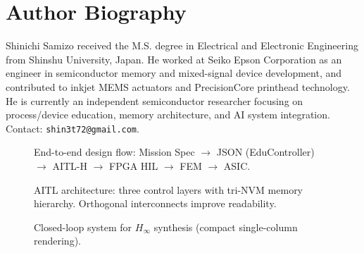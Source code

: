 \documentclass[conference]{IEEEtran}
\begin{document}
\section*{Author Biography}
\begingroup\small
Shinichi Samizo received the M.S. degree in Electrical and Electronic Engineering from Shinshu University, Japan. He worked at Seiko Epson Corporation as an engineer in semiconductor memory and mixed-signal device development, and contributed to inkjet MEMS actuators and PrecisionCore printhead technology. He is currently an independent semiconductor researcher focusing on process/device education, memory architecture, and AI system integration. Contact: \texttt{shin3t72@gmail.com}.
\endgroup

\FloatBarrier %

\begin{figure*}[!b]
  \centering
  \resizebox{0.60\textwidth}{!}{%
  }
  \vspace{-2mm}
  \caption{End-to-end design flow: Mission Spec $\rightarrow$ JSON (EduController) $\rightarrow$ AITL-H $\rightarrow$ FPGA HIL $\rightarrow$ FEM $\rightarrow$ ASIC.}
  \label{fig:flow}
\end{figure*}

\begin{figure*}[!b]
  \centering
  \resizebox{0.90\textwidth}{!}{%
  }
  \vspace{-1mm}
  \caption{AITL architecture: three control layers with tri-NVM memory hierarchy. Orthogonal interconnects improve readability.}
  \label{fig:arch}
\end{figure*}

\begin{figure*}[!b]
  \centering
  \resizebox{0.55\textwidth}{!}{%
  }
  \vspace{-2mm}
  \caption{Closed-loop system for $H_\infty$ synthesis (compact single-column rendering).}
  \label{fig:closed}
\end{figure*}
\end{document}
